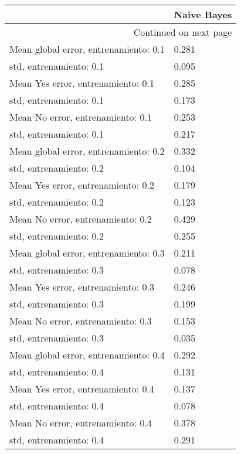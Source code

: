 \begin{longtable}{p{4cm}|p{1.5cm}}
\toprule
{} &  Naive Bayes \\
\midrule
\endhead
\midrule
\multicolumn{2}{r}{{Continued on next page}} \\
\midrule
\endfoot

\bottomrule
\endlastfoot
Mean global error, entrenamiento: 0.1 &        0.281 \\
std, entrenamiento: 0.1               &        0.095 \\
Mean Yes error, entrenamiento: 0.1    &        0.285 \\
std, entrenamiento: 0.1               &        0.173 \\
Mean No error, entrenamiento: 0.1     &        0.253 \\
std, entrenamiento: 0.1               &        0.217 \\
Mean global error, entrenamiento: 0.2 &        0.332 \\
std, entrenamiento: 0.2               &        0.104 \\
Mean Yes error, entrenamiento: 0.2    &        0.179 \\
std, entrenamiento: 0.2               &        0.123 \\
Mean No error, entrenamiento: 0.2     &        0.429 \\
std, entrenamiento: 0.2               &        0.255 \\
Mean global error, entrenamiento: 0.3 &        0.211 \\
std, entrenamiento: 0.3               &        0.078 \\
Mean Yes error, entrenamiento: 0.3    &        0.246 \\
std, entrenamiento: 0.3               &        0.199 \\
Mean No error, entrenamiento: 0.3     &        0.153 \\
std, entrenamiento: 0.3               &        0.035 \\
Mean global error, entrenamiento: 0.4 &        0.292 \\
std, entrenamiento: 0.4               &        0.131 \\
Mean Yes error, entrenamiento: 0.4    &        0.137 \\
std, entrenamiento: 0.4               &        0.078 \\
Mean No error, entrenamiento: 0.4     &        0.378 \\
std, entrenamiento: 0.4               &        0.291 \\

\end{longtable}
